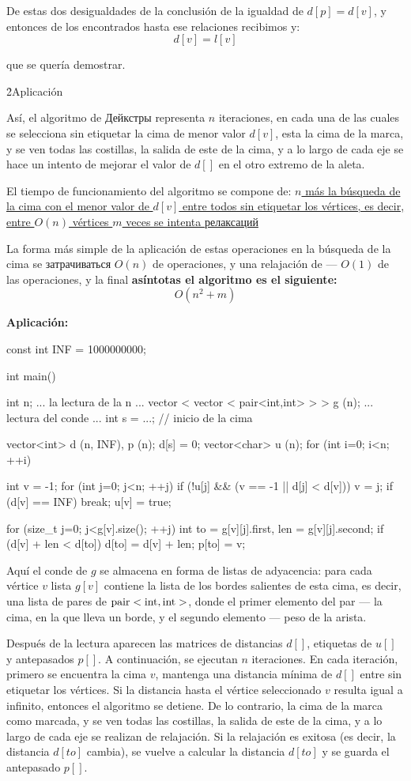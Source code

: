 De estas dos desigualdades de la conclusión de la igualdad de $d[p] = d[v]$, y entonces de los encontrados hasta ese relaciones recibimos y:
$$ d[v] = l[v] $$

que se quería demostrar.

\h2{Aplicación}

Así, el algoritmo de Дейкстры representa $n$ iteraciones, en cada una de las cuales se selecciona sin etiquetar la cima de menor valor $d[v]$, esta la cima de la marca, y se ven todas las costillas, la salida de este de la cima, y a lo largo de cada eje se hace un intento de mejorar el valor de $d[]$ en el otro extremo de la aleta.

El tiempo de funcionamiento del algoritmo se compone de:
\ul{
\li $n$ más la búsqueda de la cima con el menor valor de $d[v]$ entre todos sin etiquetar los vértices, es decir, entre $O(n)$ vértices
\li $m$ veces se intenta релаксаций
}

La forma más simple de la aplicación de estas operaciones en la búsqueda de la cima se затрачиваться $O(n)$ de operaciones, y una relajación de --- $O(1)$ de las operaciones, y la final \bf{asíntotas} el algoritmo es el siguiente:
$$ O(n^2+m) $$

\bf{Aplicación}:

\code
const int INF = 1000000000;

int main() {
int n;
... la lectura de la n ...
vector < vector < pair<int,int> > > g (n);
... lectura del conde ...
int s = ...; // inicio de la cima

vector<int> d (n, INF), p (n);
d[s] = 0;
vector<char> u (n);
for (int i=0; i<n; ++i) {
int v = -1;
for (int j=0; j<n; ++j)
if (!u[j] && (v == -1 || d[j] < d[v]))
v = j;
if (d[v] == INF)
break;
u[v] = true;

for (size_t j=0; j<g[v].size(); ++j) {
int to = g[v][j].first,
len = g[v][j].second;
if (d[v] + len < d[to]) {
d[to] = d[v] + len;
p[to] = v;
}
}
}
}
\endcode

Aquí el conde de $g$ se almacena en forma de listas de adyacencia: para cada vértice $v$ lista $g[v]$ contiene la lista de los bordes salientes de esta cima, es decir, una lista de pares de $\rm pair<int,int>$, donde el primer elemento del par --- la cima, en la que lleva un borde, y el segundo elemento --- peso de la arista.

Después de la lectura aparecen las matrices de distancias $d[]$, etiquetas de $u[]$ y antepasados $p[]$. A continuación, se ejecutan $n$ iteraciones. En cada iteración, primero se encuentra la cima $v$, mantenga una distancia mínima de $d[]$ entre sin etiquetar los vértices. Si la distancia hasta el vértice seleccionado $v$ resulta igual a infinito, entonces el algoritmo se detiene. De lo contrario, la cima de la marca como marcada, y se ven todas las costillas, la salida de este de la cima, y a lo largo de cada eje se realizan de relajación. Si la relajación es exitosa (es decir, la distancia $d[to]$ cambia), se vuelve a calcular la distancia $d[to]$ y se guarda el antepasado $p[]$.

